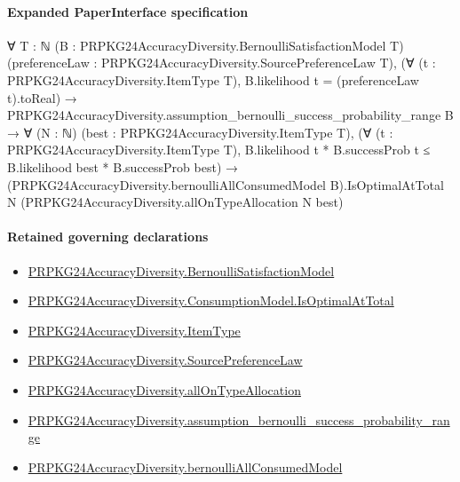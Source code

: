 \documentclass[10pt]{article}
\begin{document}
\paragraph{Expanded PaperInterface specification}
\begin{ReviewVerbatim}
∀ {T : ℕ} (B : PRPKG24AccuracyDiversity.BernoulliSatisfactionModel T)
  (preferenceLaw : PRPKG24AccuracyDiversity.SourcePreferenceLaw T),
  (∀ (t : PRPKG24AccuracyDiversity.ItemType T), B.likelihood t = (preferenceLaw t).toReal) →
    PRPKG24AccuracyDiversity.assumption_bernoulli_success_probability_range B →
      ∀ (N : ℕ) (best : PRPKG24AccuracyDiversity.ItemType T),
        (∀ (t : PRPKG24AccuracyDiversity.ItemType T),
            B.likelihood t * B.successProb t ≤ B.likelihood best * B.successProb best) →
          (PRPKG24AccuracyDiversity.bernoulliAllConsumedModel B).IsOptimalAtTotal N
            (PRPKG24AccuracyDiversity.allOnTypeAllocation N best)
\end{ReviewVerbatim}

\paragraph{Retained governing declarations}
\begin{itemize}\raggedright
\item \hyperlink{governing-declaration-ff558d2515b00bf9}{PRPKG24\allowbreak{}Accuracy\allowbreak{}Diversity.\allowbreak{}Bernoulli\allowbreak{}Satisfaction\allowbreak{}Model}
\item \hyperlink{governing-declaration-dce768684c24aad2}{PRPKG24\allowbreak{}Accuracy\allowbreak{}Diversity.\allowbreak{}Consumption\allowbreak{}Model.\allowbreak{}Is\allowbreak{}Optimal\allowbreak{}At\allowbreak{}Total}
\item \hyperlink{governing-declaration-562ef32e180a12be}{PRPKG24\allowbreak{}Accuracy\allowbreak{}Diversity.\allowbreak{}Item\allowbreak{}Type}
\item \hyperlink{governing-declaration-e662f313179ba80f}{PRPKG24\allowbreak{}Accuracy\allowbreak{}Diversity.\allowbreak{}Source\allowbreak{}Preference\allowbreak{}Law}
\item \hyperlink{governing-declaration-292edfa75481381f}{PRPKG24\allowbreak{}Accuracy\allowbreak{}Diversity.\allowbreak{}all\allowbreak{}On\allowbreak{}Type\allowbreak{}Allocation}
\item \hyperlink{governing-declaration-a02e2edc7e20e56a}{PRPKG24\allowbreak{}Accuracy\allowbreak{}Diversity.\allowbreak{}assumption\_\allowbreak{}bernoulli\_\allowbreak{}success\_\allowbreak{}probability\_\allowbreak{}range}
\item \hyperlink{governing-declaration-9dfd65f432a88171}{PRPKG24\allowbreak{}Accuracy\allowbreak{}Diversity.\allowbreak{}bernoulli\allowbreak{}All\allowbreak{}Consumed\allowbreak{}Model}
\end{itemize}
\end{document}

